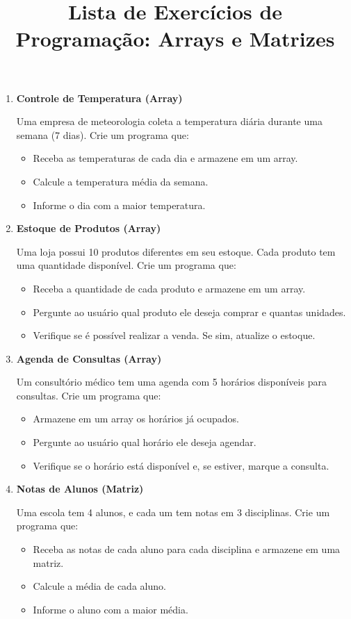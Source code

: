 \documentclass{article}
\title{Lista de Exercícios de Programação: Arrays e Matrizes}
\author{}
\date{}
\begin{document}
\maketitle

\begin{enumerate}

\item \textbf{Controle de Temperatura (Array)}

Uma empresa de meteorologia coleta a temperatura diária durante uma semana (7 dias). Crie um programa que:
\begin{itemize}
    \item Receba as temperaturas de cada dia e armazene em um array.
    \item Calcule a temperatura média da semana.
    \item Informe o dia com a maior temperatura.
\end{itemize}

\item \textbf{Estoque de Produtos (Array)}

Uma loja possui 10 produtos diferentes em seu estoque. Cada produto tem uma quantidade disponível. Crie um programa que:
\begin{itemize}
    \item Receba a quantidade de cada produto e armazene em um array.
    \item Pergunte ao usuário qual produto ele deseja comprar e quantas unidades.
    \item Verifique se é possível realizar a venda. Se sim, atualize o estoque.
\end{itemize}

\item \textbf{Agenda de Consultas (Array)}

Um consultório médico tem uma agenda com 5 horários disponíveis para consultas. Crie um programa que:
\begin{itemize}
    \item Armazene em um array os horários já ocupados.
    \item Pergunte ao usuário qual horário ele deseja agendar.
    \item Verifique se o horário está disponível e, se estiver, marque a consulta.
\end{itemize}

\item \textbf{Notas de Alunos (Matriz)}

Uma escola tem 4 alunos, e cada um tem notas em 3 disciplinas. Crie um programa que:
\begin{itemize}
    \item Receba as notas de cada aluno para cada disciplina e armazene em uma matriz.
    \item Calcule a média de cada aluno.
    \item Informe o aluno com a maior média.
\end{itemize}


\end{enumerate}
\end{document}

